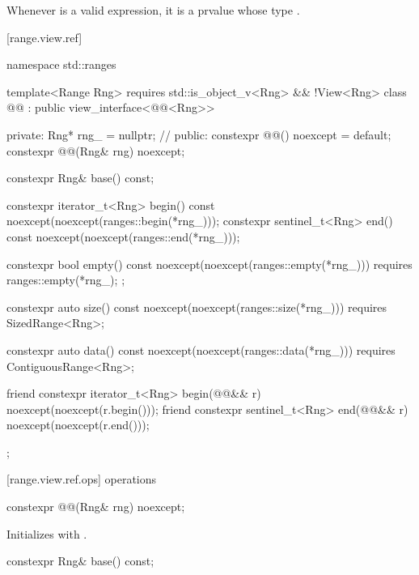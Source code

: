 \begin{note}
Whenever  is a valid expression, it is a prvalue
whose type   .
\end{note}

{\color{newclr}
[range.view.ref]{}

\begin{codeblock}
namespace std::ranges {
  template<Range Rng>
    requires std::is_object_v<Rng> && !View<Rng>
  class @@ : public view_interface<@@<Rng>> {
  private:
    Rng* rng_ = nullptr; // \expos
  public:
    constexpr @@() noexcept = default;
    constexpr @@(Rng& rng) noexcept;

    constexpr Rng& base() const;

    constexpr iterator_t<Rng> begin() const
      noexcept(noexcept(ranges::begin(*rng_)));
    constexpr sentinel_t<Rng> end() const
      noexcept(noexcept(ranges::end(*rng_)));

    constexpr bool empty() const
      noexcept(noexcept(ranges::empty(*rng_)))
      requires { ranges::empty(*rng_); };

    constexpr auto size() const
      noexcept(noexcept(ranges::size(*rng_)))
      requires SizedRange<Rng>;

    constexpr auto data() const
      noexcept(noexcept(ranges::data(*rng_)))
      requires ContiguousRange<Rng>;

    friend constexpr iterator_t<Rng> begin(@@&& r)
      noexcept(noexcept(r.begin()));
    friend constexpr sentinel_t<Rng> end(@@&& r)
      noexcept(noexcept(r.end()));
  };
}
\end{codeblock}

[range.view.ref.ops]{ operations}

%
\begin{itemdecl}
constexpr @@(Rng& rng) noexcept;
\end{itemdecl}

\begin{itemdescr}
\pnum
\effects Initializes  with .
\end{itemdescr}

%
\begin{itemdecl}
constexpr Rng& base() const;
\end{itemdecl}

}
